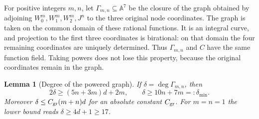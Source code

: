 \documentclass[11pt]{article}
\newtheorem{lemma}[theorem]{Lemma}
\theoremstyle{definition}
\theoremstyle{remark}
\begin{document}
For positive integers $m,n$, let $\Gamma_{m,n}\subseteq\mathbb A^7$ be
the closure of the graph obtained by adjoining
$W_0^m,W_1^m,W_2^m,J^n$ to the three original node coordinates.
The graph is taken on the common domain of these rational functions.
It is an integral curve, and projection to the first three coordinates
is birational: on that domain the four remaining coordinates are
uniquely determined.  Thus $\Gamma_{m,n}$ and $C$ have the same function
field.  Taking powers does not lose this property, because the original
coordinates remain in the graph.

\begin{lemma}[Degree of the powered graph]\label{lem:jointpowereddegree}
If $\delta=\deg\Gamma_{m,n}$, then
\begin{equation}\label{eq:jointdegree}
 2\delta\ge(5n+3m)d+2m,
 \qquad
 \delta\ge10n+7m=:\delta_{\min}.
\end{equation}
Moreover $\delta\le C_{\rm gr}(m+n)d$ for an absolute constant $C_{\rm gr}$.
For $m=n=1$ the lower bound reads $\delta\ge4d+1\ge17$.
\end{lemma}
\end{document}
